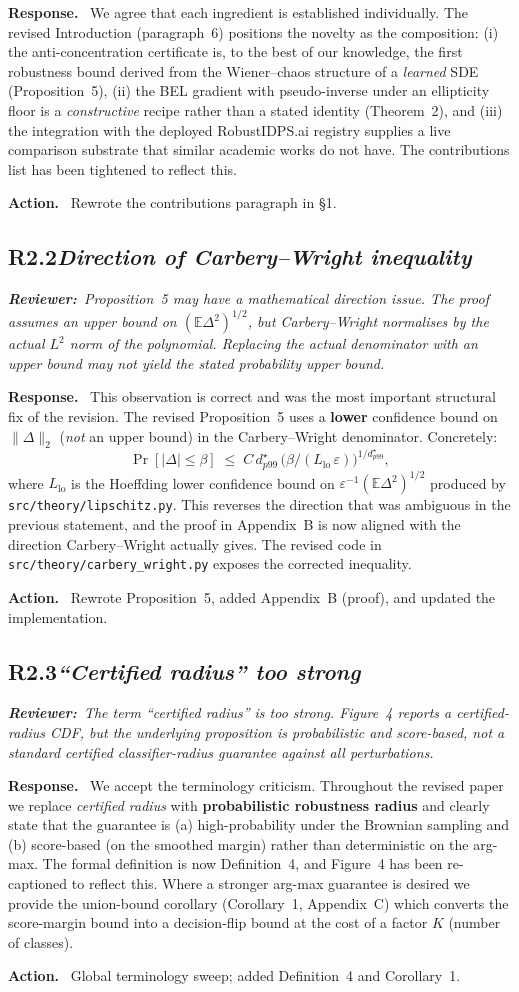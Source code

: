 \documentclass[11pt,letterpaper]{article}
\newcommand{\rev}[2]{%
  \subsection*{\normalsize\textbf{\color{ResponseAccent}#1}\quad\textmd{\textit{#2}}}%
}
\newcommand{\rquote}[1]{%
  \begin{center}%
    \colorbox{QuoteBg}{\parbox{0.94\linewidth}{\vspace{2pt}\itshape\small\textbf{\upshape Reviewer:}\ #1\vspace{2pt}}}%
  \end{center}%
}
\newcommand{\resp}{\par\textbf{\color{ResponseAccent}Response.}\ }
\newcommand{\action}{\par\textbf{\color{ResponseAccent}Action.}\ }
\begin{document}
\resp
We agree that each ingredient is established individually. The revised
Introduction (paragraph~6) positions the novelty as the composition:
(i) the anti-concentration certificate is, to the best of our
knowledge, the first robustness bound derived from the Wiener--chaos
structure of a \emph{learned} SDE (Proposition~5), (ii) the BEL
gradient with pseudo-inverse under an ellipticity floor is a
\emph{constructive} recipe rather than a stated identity (Theorem~2),
and (iii) the integration with the deployed RobustIDPS.ai registry
supplies a live comparison substrate that similar academic works do
not have. The contributions list has been tightened to reflect this.
\action
Rewrote the contributions paragraph in \S1.

\rev{R2.2}{Direction of Carbery--Wright inequality}
\rquote{Proposition~5 may have a mathematical direction issue. The
proof assumes an upper bound on $(\mathbb E\Delta^2)^{1/2}$, but
Carbery--Wright normalises by the actual $L^2$ norm of the polynomial.
Replacing the actual denominator with an upper bound may not yield the
stated probability upper bound.}

\resp
This observation is correct and was the most important structural fix
of the revision. The revised Proposition~5 uses a \textbf{lower}
confidence bound on $\|\Delta\|_2$ (\emph{not} an upper bound) in the
Carbery--Wright denominator. Concretely:
\[
  \Pr[|\Delta|\le\beta]\;\le\;C\,d^\star_{p99}\,
       \bigl(\beta/(L_{\mathrm{lo}}\,\varepsilon)\bigr)^{1/d^\star_{p99}},
\]
where $L_{\mathrm{lo}}$ is the Hoeffding lower confidence bound on
$\varepsilon^{-1}(\mathbb E\Delta^2)^{1/2}$ produced by
\texttt{src/theory/lipschitz.py}. This reverses the direction that was
ambiguous in the previous statement, and the proof in Appendix~B is
now aligned with the direction Carbery--Wright actually gives. The
revised code in \texttt{src/theory/carbery\_wright.py} exposes the
corrected inequality.
\action
Rewrote Proposition~5, added Appendix~B (proof), and updated the
implementation.

\rev{R2.3}{``Certified radius'' too strong}
\rquote{The term ``certified radius'' is too strong. Figure~4 reports
a certified-radius CDF, but the underlying proposition is probabilistic
and score-based, not a standard certified classifier-radius guarantee
against all perturbations.}

\resp
We accept the terminology criticism. Throughout the revised paper we
replace \emph{certified radius} with \textbf{probabilistic robustness
radius} and clearly state that the guarantee is (a) high-probability
under the Brownian sampling and (b) score-based (on the smoothed
margin) rather than deterministic on the arg-max. The formal
definition is now Definition~4, and Figure~4 has been re-captioned to
reflect this. Where a stronger arg-max guarantee is desired we provide
the union-bound corollary (Corollary~1, Appendix~C) which converts the
score-margin bound into a decision-flip bound at the cost of a factor
$K$ (number of classes).
\action
Global terminology sweep; added Definition~4 and Corollary~1.
\end{document}
